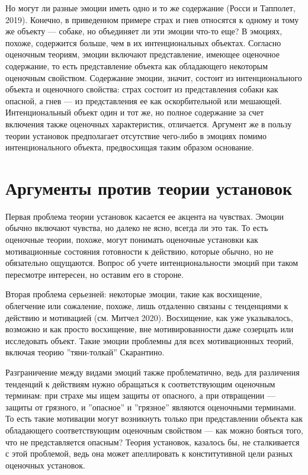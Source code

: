 \documentclass[11pt]{book}
\begin{document}
Но могут ли разные эмоции иметь одно и то же содержание (Росси и Тапполет, 2019). Конечно, в приведенном примере страх и гнев относятся к одному и тому же объекту --- собаке, но объединяет ли эти эмоции что-то еще? В эмоциях, похоже, содержится больше, чем в их интенциональных объектах. Согласно оценочным теориям, эмоции включают представление, имеющее оценочное содержание, то есть представление объекта как обладающего некоторым оценочным свойством. Содержание эмоции, значит, состоит из интенционального объекта и оценочного свойства: страх состоит из представления собаки как опасной, а гнев --- из представления ее как оскорбительной или мешающей. Интенциональный объект один и тот же, но полное содержание за счет включения также оценочных характеристик, отличается. Аргумент же в пользу теории установок предполагает отсутствие чего-либо в эмоциях помимо интенционального объекта, предвосхищая таким образом основание.

\section{Аргументы против теории установок}

Первая проблема теории установок касается ее акцента на чувствах. Эмоции обычно включают чувства, но далеко не ясно, всегда ли это так. То есть оценочные теории, похоже, могут понимать оценочные установки как мотивационные состояния готовности к действию, которые обычно, но не обязательно ощущаются. Вопрос об учете интенциональности эмоций при таком пересмотре интересен, но оставим его в стороне.

Вторая проблема серьезней: некоторые эмоции, такие как восхищение, облегчение или сожаление, похоже, лишь отдаленно связаны с тенденциями к действию и мотивацией (см. Митчел 2020). Восхищение, как уже указывалось, возможно и как просто восхищение, вне мотивированности даже созерцать или исследовать объект. Такие эмоции проблемны для всех мотивационных теорий, включая теорию ''тяни-толкай'' Скарантино.

Разграничение между видами эмоций также проблематично, ведь для различения тенденций к действиям нужно обращаться к соответствующим оценочным терминам: при страхе мы ищем защиты от опасного, а при отвращении --- защиты от грязного, и ''опасное'' и ''грязное'' являются оценочными терминами. То есть такие мотивации могут возникнуть только при представлении объекта как обладающего соответствующим оценочным свойством --- как можно бояться того, что не представляется опасным? Теория установок, казалось бы, не сталкивается с этой проблемой, ведь она может апеллировать к конститутивной цели разных оценочных установок.
\end{document}
